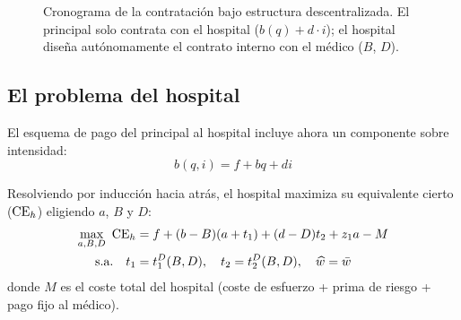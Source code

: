 \begin{figure}[htbp]
\centering
{}%
\caption{Cronograma de la contratación bajo estructura descentralizada.
  El principal solo contrata con el hospital ($b(q) + d \cdot i$);
  el hospital diseña autónomamente el contrato interno
  con el médico ($B$, $D$).}
\label{fig:cronograma_d}
\end{figure}
\subsection{El problema del hospital}

El esquema de pago del principal al hospital incluye ahora un componente sobre intensidad:
\begin{equation}
  b(q,i) = f + bq + di
  \label{eq:pago_h_desc}
\end{equation}

Resolviendo por inducción hacia atrás, el hospital maximiza su equivalente cierto ($\mathrm{CE}_h$) eligiendo $a$, $B$ y $D$:
\begin{align*}
  \max_{a,B,D}\ \mathrm{CE}_h &= f+(b-B)(a+t_1)+(d-D)t_2+z_1a-M\\
  \text{s.a.}\quad t_1 &= t_1^{D}(B,D), \quad t_2 = t_2^{D}(B,D), \quad \widehat{w}=\bar{w}
\end{align*}
donde $M$ es el coste total del hospital (coste de esfuerzo + prima de riesgo + pago fijo al médico).


